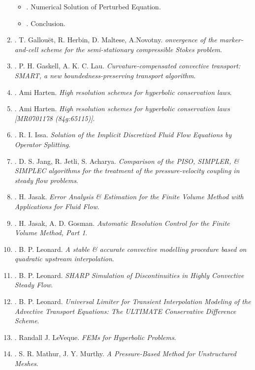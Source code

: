 \documentclass{article}
\begin{document}
\begin{enumerate}
\begin{itemize}
		\item {. Numerical Solution of Perturbed Equation.}
		\item {. Conclusion.}
	\end{itemize}
	
	\item \cite{Gallouet_Herbin_Maltese_Novotny2017}. {\sc T. Gallou\"{e}t, R. Herbin, D. Maltese, A.Novotny}. {\it onvergence of the marker-and-cell scheme for the semi-stationary compressible Stokes problem}.
	\item \cite{Gaskell_Lau1988}. {\sc P. H. Gaskell, A. K. C. Lau}. {\it Curvature-compensated convective transport: SMART, a new boundedness-preserving transport algorithm}.
	\item \cite{Harten1983}. {\sc Ami Harten}. {\it High resolution schemes for hyperbolic conservation laws}.
	\item \cite{Harten1997}. {\sc Ami Harten}. {\it High resolution schemes for hyperbolic conservation laws [{MR}0701178 (84g:65115)]}.
	\item \cite{Issa1986}. {\sc R. I. Issa}. {\it Solution of the Implicit Discretized Fluid Flow Equations by Operator Splitting}.
	\item \cite{Jang_Jetli_Acharya1986}. {\sc D. S. Jang, R. Jetli, S. Acharya}. {\it Comparison of the PISO, SIMPLER, \& SIMPLEC algorithms for the treatment of the pressure-velocity coupling in steady flow problems}.
	\item \cite{Jasak1996}. {\sc H. Jasak}. {\it Error Analysis \& Estimation for the Finite Volume Method with Applications for Fluid Flow}.
	\item \cite{Jasak_Gosman2000}. {\sc H. Jasak,  A. D. Gosman}. {\it Automatic Resolution Control for the Finite Volume  Method, Part 1}.
	\item \cite{Leonard1979}. {\sc B. P. Leonard}. {\it A stable \& accurate convective modelling procedure based on quadratic upstream interpolation}.
	\item \cite{Leonard1987}. {\sc B. P. Leonard}. {\it SHARP Simulation of Discontinuities in Highly Convective Steady Flow}.
	\item \cite{Leonard1988}. {\sc B. P. Leonard}. {\it Universal Limiter for Transient Interpolation Modeling of the Advective Transport Equations: The ULTIMATE Conservative Difference Scheme}.
	\item \cite{LeVeque2002}. {\sc Randall J. LeVeque}. {\it FEMs for Hyperbolic Problems}.
	\item \cite{Mathur_Murthy1997}. {\sc S. R. Mathur, J. Y. Murthy}. {\it A Pressure-Based Method for Unstructured Meshes}.

\end{enumerate}
\end{document}
